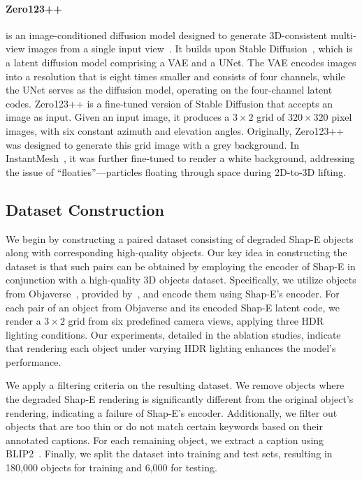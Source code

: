 \paragraph{Zero123++} is an image-conditioned diffusion model designed to generate 3D-consistent multi-view images from a single input view~\cite{shi2023zero123singleimageconsistent}. It builds upon Stable Diffusion~\cite{rombach2022highresolutionimagesynthesislatent}, which is a latent diffusion model comprising a VAE and a UNet. The VAE encodes images into a resolution that is eight times smaller and consists of four channels, while the UNet serves as the diffusion model, operating on the four-channel latent codes.
Zero123++ is a fine-tuned version of Stable Diffusion that accepts an image as input. Given an input image, it produces a $3\times2$ grid of $320\times320$ pixel images, with six constant azimuth and elevation angles.
Originally, Zero123++~\cite{shi2023zero123singleimageconsistent} was designed to generate this grid image with a grey background. In InstantMesh~\cite{xu2024instantmesh}, it was further fine-tuned to render a white background, addressing the issue of ``floaties''—particles floating through space during 2D-to-3D lifting.

\subsection{Dataset Construction}\label{sec:data}%
We begin by constructing a paired dataset consisting of degraded Shap-E objects along with corresponding high-quality objects. Our key idea in constructing the dataset is that such pairs can be obtained by employing the encoder of Shap-E in conjunction with a high-quality 3D objects dataset.
Specifically, we utilize objects from Objaverse~\cite{deitke2023objaversexluniverse10m3d}, provided by~\cite{luo2023scalable, luo2024view}, and encode them using Shap-E's encoder. For each pair of an object from Objaverse and its encoded Shap-E latent code, we render a $3\times2$ grid from six predefined camera views, applying three HDR lighting conditions. Our experiments, detailed in the ablation studies, indicate that rendering each object under varying HDR lighting enhances the model’s performance.

We apply a filtering criteria on the resulting dataset.
We remove objects where the degraded Shap-E rendering is significantly different from the original object's rendering, indicating a failure of Shap-E's encoder. Additionally, we filter out objects that are too thin or do not match certain keywords based on their annotated captions. For each remaining object, we extract a caption using BLIP2~\cite{li2023blip2}.
Finally, we split the dataset into training and test sets, resulting in 180,000 objects for training and 6,000 for testing.

